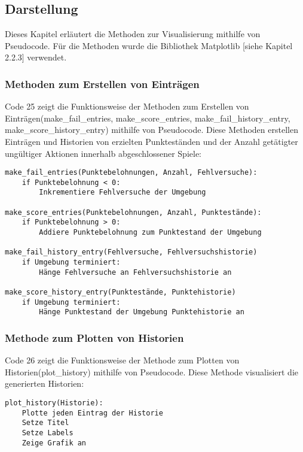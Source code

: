 \subsection{Darstellung}
Dieses Kapitel erläutert die Methoden zur Visualisierung mithilfe von Pseudocode. Für die Methoden wurde die Bibliothek Matplotlib [siehe Kapitel 2.2.3] verwendet.
\subsubsection{Methoden zum Erstellen von Einträgen}
\begin{minipage}{\linewidth}
Code 25 zeigt die Funktionsweise der Methoden zum Erstellen von Einträgen(make\_fail\_entries, make\_score\_entries, make\_fail\_history\_entry, make\_score\_history\_entry) mithilfe von Pseudocode. Diese Methoden erstellen Einträgen und Historien von erzielten Punkteständen und der Anzahl getätigter ungültiger Aktionen innerhalb abgeschlossener Spiele:
\vspace{0.5cm}
\begin{lstlisting}[caption={Methoden zum Erstellen von Einträgen für Hisorien}]
make_fail_entries(Punktebelohnungen, Anzahl, Fehlversuche):
	if Punktebelohnung < 0:
		Inkrementiere Fehlversuche der Umgebung

make_score_entries(Punktebelohnungen, Anzahl, Punktestände):
	if Punktebelohnung > 0:
		Addiere Punktebelohnung zum Punktestand der Umgebung

make_fail_history_entry(Fehlversuche, Fehlversuchshistorie)
	if Umgebung terminiert:
		Hänge Fehlversuche an Fehlversuchshistorie an
		
make_score_history_entry(Punktestände, Punktehistorie)
	if Umgebung terminiert:
		Hänge Punktestand der Umgebung Punktehistorie an
\end{lstlisting}
\end{minipage}
\subsubsection{Methode zum Plotten von Historien}
\begin{minipage}{\linewidth}
Code 26 zeigt die Funktionsweise der Methode zum Plotten von Historien(plot\_history) mithilfe von Pseudocode. Diese Methode visualisiert die generierten Historien:
\vspace{0.5cm}
\begin{lstlisting}[caption={Methode zum Plotten von Historien}]
plot_history(Historie):
	Plotte jeden Eintrag der Historie
	Setze Titel
	Setze Labels
	Zeige Grafik an
\end{lstlisting}
\end{minipage}

